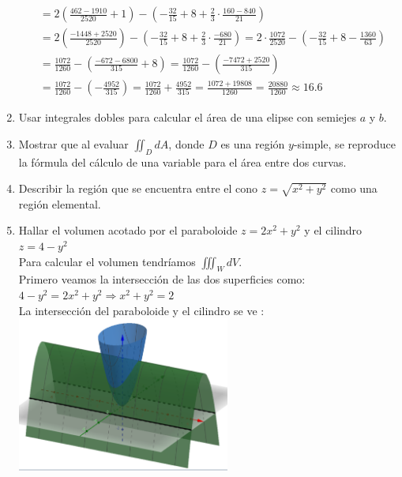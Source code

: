 \documentclass{article}
\begin{document}
\begin{enumerate}
{\begin{align*}
			&= 2(\frac{462 - 1910}{2520} + 1) - (-\frac{32}{15} + 8 + \frac{2}{3} \cdot \frac{160-840}{21})\\
			&= 2(\frac{-1448 + 2520}{2520}) - (-\frac{32}{15} + 8 + \frac{2}{3} \cdot \frac{-680}{21}) = 2 \cdot \frac{1072}{2520} - (-\frac{32}{15} + 8 - \frac{1360}{63})\\
			&= \frac{1072}{1260} - (\frac{-672-6800}{315} + 8) = \frac{1072}{1260} - (\frac{-7472+2520}{315})\\
			&= \frac{1072}{1260} - (-\frac{4952}{315}) = \frac{1072}{1260} + \frac{4952}{315} = \frac{1072+19808}{1260} = \frac{20880}{1260} \approx 16.6
		\end{align*}

	}

   \item {
   Usar integrales dobles para calcular el área de una elipse con semiejes $a$ y $b$.\\

	}

   \item {
   Mostrar que al evaluar $\iint_DdA$, donde $D$ es una región $y$-simple, se reproduce la fórmula del cálculo de una variable para el área entre dos curvas.\\



    }

   \item {
   Describir la región que se encuentra entre el cono $z = \sqrt{x^2 + y^2}$ como una región elemental.\\


    }

   \item {
   Hallar el volumen acotado por el paraboloide $z = 2x^2 + y^2$ y el cilindro $z = 4 - y^2$\\

		Para calcular el volumen tendríamos $\iiint_W dV$.\\
		
		Primero veamos la intersección de las dos superficies como: $4-y^2 = 2x^2 + y^2 \Rightarrow x^2+y^2 = 2$\\

		La intersección del paraboloide y el cilindro se ve :
		\includegraphics[width=7cm]{ejercicio7.png}\\
		
}
\end{enumerate}
\end{document}
